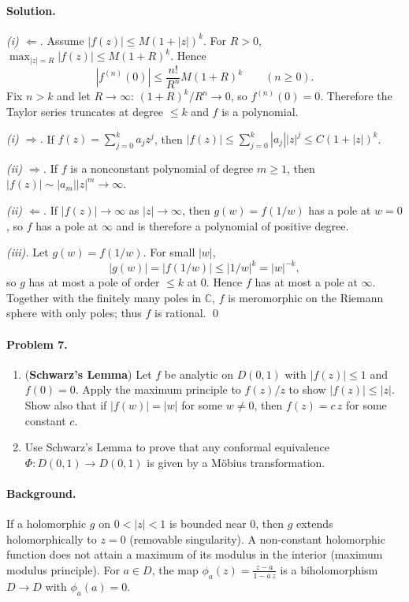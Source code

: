 \documentclass[11pt,a4paper]{article}
\theoremstyle{definition}
\theoremstyle{definition}
\theoremstyle{plain}
\theoremstyle{remark}
\begin{document}
\paragraph{Solution.}
\emph{(i) $\Leftarrow$.}
Assume $|f(z)|\le M(1+|z|)^k$. For $R>0$, $\max_{|z|=R}|f(z)|\le M(1+R)^k$. Hence
\[
|f^{(n)}(0)|\le \frac{n!}{R^n}M(1+R)^k \qquad (n\ge 0).
\]
Fix $n>k$ and let $R\to\infty$: $(1+R)^k/R^n\to 0$, so $f^{(n)}(0)=0$. Therefore the Taylor series truncates at degree $\le k$ and $f$ is a polynomial.

\smallskip
\emph{(i) $\Rightarrow$.}
If $f(z)=\sum_{j=0}^k a_j z^j$, then $|f(z)|\le \sum_{j=0}^k |a_j||z|^j \le C(1+|z|)^k$.

\medskip
\emph{(ii) $\Rightarrow$.}
If $f$ is a nonconstant polynomial of degree $m\ge 1$, then $|f(z)|\sim |a_m||z|^m\to\infty$.

\emph{(ii) $\Leftarrow$.}
If $|f(z)|\to\infty$ as $|z|\to\infty$, then $g(w)=f(1/w)$ has a pole at $w=0$, so $f$ has a pole at $\infty$ and is therefore a polynomial of positive degree.

\medskip
\emph{(iii).}
Let $g(w)=f(1/w)$. For small $|w|$,
\[
|g(w)|=|f(1/w)|\le |1/w|^k=|w|^{-k},
\]
so $g$ has at most a pole of order $\le k$ at $0$. Hence $f$ has at most a pole at $\infty$. Together with the finitely many poles in $\mathbb C$, $f$ is meromorphic on the Riemann sphere with only poles; thus $f$ is rational.
\qed

\paragraph{Problem 7.}
\begin{enumerate}[label=(\roman*)]
	\item (\textbf{Schwarz's Lemma}) Let $f$ be analytic on $D(0,1)$ with $|f(z)|\le 1$ and $f(0)=0$.
	Apply the maximum principle to $f(z)/z$ to show $|f(z)|\le |z|$. Show also that if $|f(w)|=|w|$ for some $w\neq 0$, then $f(z)=c\,z$ for some constant $c$.
	
	\item Use Schwarz's Lemma to prove that any conformal equivalence $\Phi:D(0,1)\to D(0,1)$ is given by a Möbius transformation.
\end{enumerate}

\paragraph{Background.}
If a holomorphic $g$ on $0<|z|<1$ is bounded near $0$, then $g$ extends holomorphically to $z=0$ (removable singularity).
A non-constant holomorphic function does not attain a maximum of its modulus in the interior (maximum modulus principle).
For $a\in D$, the map $\displaystyle \phi_a(z)=\frac{z-a}{1-\overline a\,z}$ is a biholomorphism $D\to D$ with $\phi_a(a)=0$.
\end{document}
